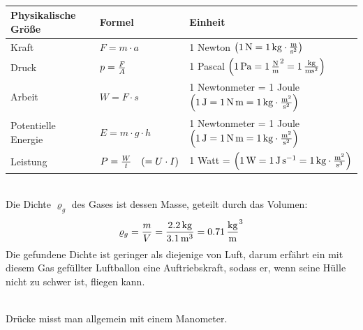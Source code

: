 \documentclass[a4paper]{article}
\begin{document}
\vspace{0.5 cm}


\\
\renewcommand{\arraystretch}{3}
\begin{tabular}{|p{3.5 cm}|p{3.5 cm}|p{10 cm}|}
	\hline
	Physikalische Größe &  Formel & Einheit \\
	\hline
	Kraft & $F = m \cdot a $ & 1 Newton $\left(\SI{1}{\newton} = \SI{1}{\kilogram \cdot {\meter \over \second^2}}\right)$\\
	\hline
	Druck & $p = {F  \over A}$ & 1 Pascal $\left(\SI{1}{\pascal} =\SI{1}{\newton\over\meter^2}=\SI{1}{\kilogram\over{\meter\second^2}}\right)$\\
	\hline
	Arbeit & $ W = F \cdot s $ & 1 Newtonmeter = 1 Joule $\left(\SI{1}{\joule} =\SI{1}{\newton\meter} = \SI{1}{\kilogram \cdot { \meter^2 \over \second^2}}\right)$\\
	\hline
	Potentielle Energie & $ E =  m \cdot g \cdot h $ & 1 Newtonmeter = 1 Joule $\left(\SI{1}{\joule} =\SI{1}{\newton \meter}=\SI{1}{\kilogram \cdot {\meter^2 \over \second^2}}\right)$\\
	\hline
	Leistung & $P = {W \over t}\quad (=U \cdot I)$ & 1 Watt = $\left( \SI{1}{\watt} =\SI{1}{\joule\per \second} =\SI{1}{\kilogram\cdot {\meter^2 \over \second^3}} \right) $\\
	\hline
\end{tabular}
\vspace{1 cm}

\\
Die Dichte $\varrho_g$ des Gases ist dessen Masse, geteilt durch das Volumen:
$$\varrho_g={m \over V} = {\SI{2,2}{\kilogram}\over\SI{3,1}{\meter^3}}= \SI{0,71}{\kilogram \over \meter^3}$$
Die gefundene Dichte ist geringer als diejenige von Luft, darum erfährt ein mit diesem Gas gefüllter Luftballon eine Auftriebskraft, sodass er, wenn seine Hülle nicht zu schwer ist, fliegen kann. 
\vspace{0.5 cm}

\\
Drücke misst man allgemein mit einem Manometer.
\vspace{0.5 cm}
\end{document}

